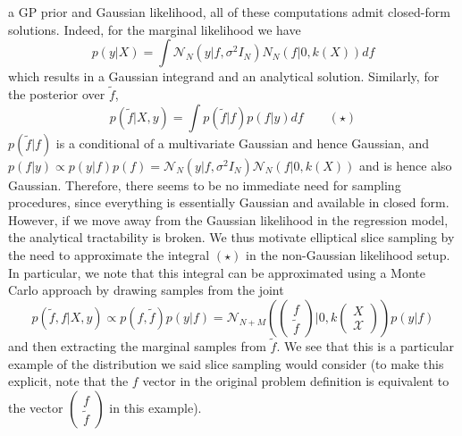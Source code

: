 \documentclass[12pt]{article}
\begin{document}
a GP prior and Gaussian likelihood, all of these computations admit closed-form solutions. Indeed, for the marginal likelihood we have 
\[p(y|X) = \int \mathcal{N}_N(y|f, \sigma^2I_N)N_{N}(f|0, k(X)) df\] 
which results in a Gaussian integrand and an analytical solution. Similarly, for the posterior over $\tilde{f}$, 
\[p(\tilde{f}|X, y) = \int p(\tilde{f}|f)p(f|y) df \qquad (\star)\]
$p(\tilde{f}|f)$ is a conditional of a multivariate Gaussian and hence Gaussian, and $p(f|y) \propto p(y|f)p(f) = \mathcal{N}_N(y|f, \sigma^2 I_N)\mathcal{N}_N(f|0, k(X))$ and is 
hence also Gaussian. Therefore, there seems to be no immediate need for sampling procedures, since everything is essentially Gaussian and available in closed form. However, if we
move away from the Gaussian likelihood in the regression model, the analytical tractability is broken. We thus motivate elliptical slice sampling by the need to approximate the integral 
$(\star)$ in the non-Gaussian likelihood setup. In particular, we note that this integral can be approximated using a Monte Carlo approach by drawing samples from the joint
\[p(\tilde{f}, f|X, y) \propto p(f, \tilde{f}) p(y|f) = \mathcal{N}_{N + M}\left(\begin{pmatrix} f \\ \tilde{f}\end{pmatrix} \bigg|0, k\begin{pmatrix} X \\ \mathcal{X}\end{pmatrix}\right)p(y|f)\]
 and then extracting the marginal samples from $\tilde{f}$. 
 We see that this is a particular example of the distribution we said slice sampling would consider (to make this explicit, note that the $f$ vector in the original problem definition 
 is equivalent to the vector $\begin{pmatrix} f \\ \tilde{f} \end{pmatrix}$ in this example). 
\end{document}
